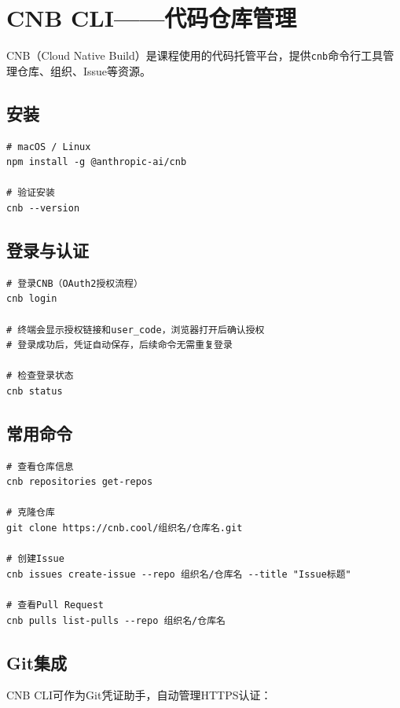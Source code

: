 \section{CNB CLI——代码仓库管理}

CNB（Cloud Native Build）是课程使用的代码托管平台，提供\texttt{cnb}命令行工具管理仓库、组织、Issue等资源。

\subsection{安装}

\begin{lstlisting}[style=shell]
# macOS / Linux
npm install -g @anthropic-ai/cnb

# 验证安装
cnb --version
\end{lstlisting}

\subsection{登录与认证}

\begin{lstlisting}[style=shell]
# 登录CNB（OAuth2授权流程）
cnb login

# 终端会显示授权链接和user_code，浏览器打开后确认授权
# 登录成功后，凭证自动保存，后续命令无需重复登录

# 检查登录状态
cnb status
\end{lstlisting}

\subsection{常用命令}

\begin{lstlisting}[style=shell]
# 查看仓库信息
cnb repositories get-repos

# 克隆仓库
git clone https://cnb.cool/组织名/仓库名.git

# 创建Issue
cnb issues create-issue --repo 组织名/仓库名 --title "Issue标题"

# 查看Pull Request
cnb pulls list-pulls --repo 组织名/仓库名
\end{lstlisting}

\subsection{Git集成}

CNB CLI可作为Git凭证助手，自动管理HTTPS认证：

